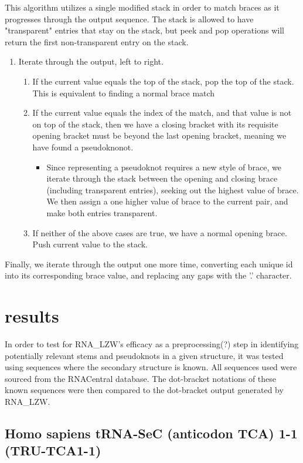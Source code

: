 \documentclass[sigconf]{acmart}
\begin{document}
This algorithm utilizes a single modified stack in order to match braces as it progresses through the output sequence. The stack is allowed to have "transparent" entries that stay on the stack, but peek and pop operations will return the first non-transparent entry on the stack.
\begin{enumerate}
	\item Iterate through the output, left to right.
		\begin{enumerate}
		\item If the current value equals the top of the stack, pop the top of the stack. This is equivalent to finding a normal brace match
		\item If the current value equals the index of the match, and that value is not on top of the stack, then we have a closing bracket with its requisite opening bracket must be beyond the last opening bracket, meaning we have found a pseudoknonot.
			\begin{itemize}
			\item Since representing a pseudoknot requires a new style of brace, we iterate through the stack between the opening and closing brace (including transparent entries), seeking out the highest value of brace. We then assign a one higher value of brace to the current pair, and make both entries transparent. 
			\end{itemize}
		\item If neither of the above cases are true, we have a normal opening brace. Push current value to the stack.
		\end{enumerate}
\end{enumerate}

Finally, we iterate through the output one more time, converting each unique id into its corresponding brace value, and replacing any gaps with the '.' character.


\section{results}

In order to test for RNA\_LZW's efficacy as a preprocessing(?) step in identifying potentially relevant stems and pseudoknots in a given structure, it was tested using sequences where the secondary structure is known.  All sequences used were sourced from the RNACentral database. The dot-bracket notations of these known sequences were then compared to the dot-bracket output generated by RNA\_LZW.


\subsection{Homo sapiens tRNA-SeC (anticodon TCA) 1-1 (TRU-TCA1-1)}
\end{document}
